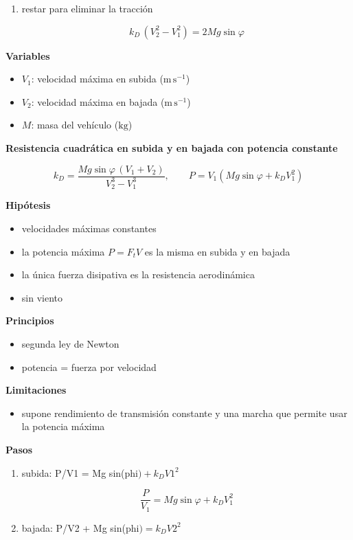 \documentclass[10pt,openany]{book}
\begin{document}
\begin{tcolorbox}[title={Desarrollos del modelo}, studiumdef, breakable]
\begin{enumerate}
\[
F_t + Mg\sin\varphi = k_D V_2^{2}
\]
\item
restar para eliminar la tracción

\[
k_D\,(V_2^{2} - V_1^{2}) = 2Mg\sin\varphi
\]
\end{enumerate}

\noindent\textbf{Variables}
\begin{itemize}
\item $V_{1}$: velocidad máxima en subida ($\mathrm{m}\,\mathrm{s}^{-1}$)
\item $V_{2}$: velocidad máxima en bajada ($\mathrm{m}\,\mathrm{s}^{-1}$)
\item $M$: masa del vehículo ($\mathrm{kg}$)
\end{itemize}



\noindent\textbf{Resistencia cuadrática en subida y en bajada con potencia constante}

\[
k_D = \frac{Mg\sin\varphi\,(V_1 + V_2)}{V_2^{3} - V_1^{3}},\qquad P = V_1\left(Mg\sin\varphi + k_D V_1^{2}\right)
\]

\noindent\textbf{Hipótesis}
\begin{itemize}
\item velocidades máximas constantes
\item la potencia máxima \(P = F_t V\) es la misma en subida y en bajada
\item la única fuerza disipativa es la resistencia aerodinámica
\item sin viento
\end{itemize}

\noindent\textbf{Principios}
\begin{itemize}
\item segunda ley de Newton
\item potencia = fuerza por velocidad
\end{itemize}

\noindent\textbf{Limitaciones}
\begin{itemize}
\item supone rendimiento de transmisión constante y una marcha que permite usar la potencia máxima
\end{itemize}

\noindent\textbf{Pasos}
\begin{enumerate}
\item
subida: P/V1 = Mg sin(phi\() + k_D V1^2\)

\[
\frac{P}{V_1} = Mg\sin\varphi + k_D V_1^{2}
\]
\item
bajada: P/V2 + Mg sin(phi\() = k_D V2^2\)


\end{enumerate}
\end{tcolorbox}
\end{document}
